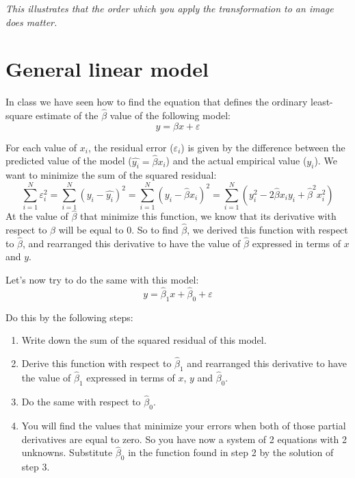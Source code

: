 \documentclass[a4paper,10pt]{article}
\begin{document}
\textit{This illustrates that the order which you apply the transformation to an image does matter.}



\section{General linear model}

In class we have seen how to find the equation that defines the ordinary least-square estimate of the $\hat{\beta}$ value of the following model:
\begin{displaymath}
  y = \beta x + \varepsilon
\end{displaymath}

For each value of $x_{i}$, the residual error ($\varepsilon_{i}$) is given by the difference between the predicted value of the model ($\hat{y_{i}} = \hat{\beta} x_{i}$) and the actual empirical value ($y_{i}$). We want to minimize the sum of the squared residual:
\begin{displaymath}
  \sum_{i=1}^{N} \varepsilon_{i}^{2} = \sum_{i=1}^{N}(y_{i} - \hat{y_{i}})^{2} = \sum_{i=1}^{N} (y_{i} - \hat{\beta} x_{i})^{2} = \sum_{i=1}^{N} (y_{i}^{2} - 2\hat{\beta} x_{i}y_{i} + \hat{\beta}^{2} x_{i}^{2})
\end{displaymath}
At the value of $\hat{\beta}$ that minimize this function, we know that its derivative with respect to $\beta$ will be equal to 0. So to find $\hat{\beta}$, we derived this function with respect to $\hat{\beta}$, and rearranged this derivative to have the value of $\hat{\beta}$ expressed in terms of $x$ and $y$.

\bigskip
Let's now try to do the same with this model:
\begin{displaymath}
  y = \hat{\beta}_{1} x + \hat{\beta}_{0} + \varepsilon
\end{displaymath}

Do this by the following steps:
\begin{enumerate}
 \item Write down the sum of the squared residual of this model.
 \item Derive this function with respect to $\hat{\beta}_{1}$ and rearranged this derivative to have the value of $\hat{\beta}_{1}$ expressed in terms of $x$, $y$ and $\hat{\beta}_{0}$.
 \item Do the same with respect to $\hat{\beta}_{0}$.
 \item You will find the values that minimize your errors when both of those partial derivatives are equal to zero. So you have now a system of 2 equations with 2 unknowns. Substitute $\hat{\beta}_{0}$ in the function found in step 2 by the solution of step 3.
\end{enumerate}
\end{document}
